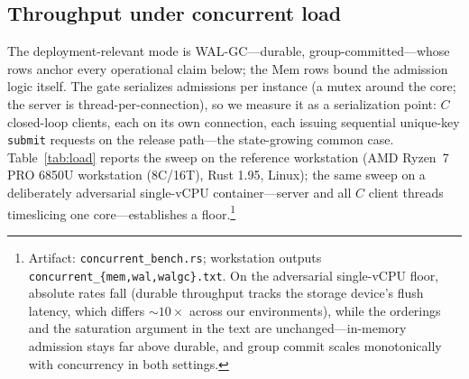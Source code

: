 \documentclass[10pt,journal,compsoc]{IEEEtran}
\newcommand{\CPUMODEL}{AMD Ryzen~7 PRO 6850U}
\newcommand{\LOADENV}{\CPUMODEL{} workstation (8C/16T), Rust 1.95, Linux}%
\begin{document}
\subsection{Throughput under concurrent load}
\label{sec:load}
The deployment-relevant mode is
\textsf{WAL-GC}---durable, group-committed---whose rows anchor every
operational claim below; the \textsf{Mem} rows bound the admission logic
itself. The gate serializes admissions per instance (a mutex around the core; the
server is thread-per-connection), so we measure it as a serialization point:
$C$ closed-loop clients, each on its own connection, each issuing sequential
unique-key \texttt{submit} requests on the release path---the state-growing
common case. Table~\ref{tab:load} reports the sweep on the reference
workstation (\LOADENV{}); the same sweep on a deliberately adversarial
single-vCPU container---server and all $C$ client threads timeslicing one
core---establishes a floor.\footnote{Artifact: \texttt{concurrent\_bench.rs};
workstation outputs \texttt{concurrent\_\{mem,wal,walgc\}.txt}. On the adversarial
single-vCPU floor, absolute rates fall (durable throughput tracks the storage
device's flush latency, which differs ${\sim}10{\times}$ across our
environments), while the orderings and the saturation argument in the text are
unchanged---in-memory admission stays far above durable, and group commit
scales monotonically with concurrency in both settings.}
\end{document}

